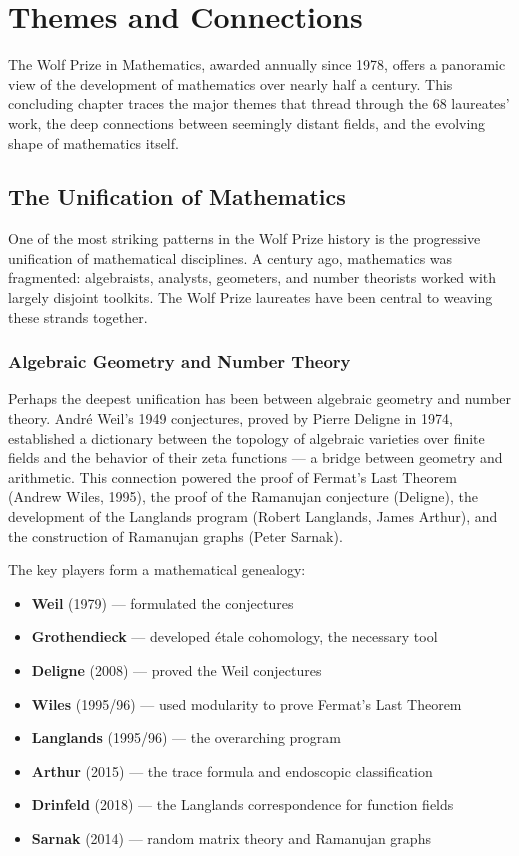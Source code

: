 \chapter{Themes and Connections}

The Wolf Prize in Mathematics, awarded annually since 1978, offers a panoramic view of the development of mathematics over nearly half a century. This concluding chapter traces the major themes that thread through the 68 laureates' work, the deep connections between seemingly distant fields, and the evolving shape of mathematics itself.

\section{The Unification of Mathematics}

One of the most striking patterns in the Wolf Prize history is the progressive unification of mathematical disciplines. A century ago, mathematics was fragmented: algebraists, analysts, geometers, and number theorists worked with largely disjoint toolkits. The Wolf Prize laureates have been central to weaving these strands together.

\subsection{Algebraic Geometry and Number Theory}

Perhaps the deepest unification has been between algebraic geometry and number theory. Andr\'e Weil's 1949 conjectures, proved by Pierre Deligne in 1974, established a dictionary between the topology of algebraic varieties over finite fields and the behavior of their zeta functions --- a bridge between geometry and arithmetic. This connection powered the proof of Fermat's Last Theorem (Andrew Wiles, 1995), the proof of the Ramanujan conjecture (Deligne), the development of the Langlands program (Robert Langlands, James Arthur), and the construction of Ramanujan graphs (Peter Sarnak).

The key players form a mathematical genealogy:
\begin{itemize}
    \item \textbf{Weil} (1979) --- formulated the conjectures
    \item \textbf{Grothendieck} --- developed \'etale cohomology, the necessary tool
    \item \textbf{Deligne} (2008) --- proved the Weil conjectures
    \item \textbf{Wiles} (1995/96) --- used modularity to prove Fermat's Last Theorem
    \item \textbf{Langlands} (1995/96) --- the overarching program
    \item \textbf{Arthur} (2015) --- the trace formula and endoscopic classification
    \item \textbf{Drinfeld} (2018) --- the Langlands correspondence for function fields
    \item \textbf{Sarnak} (2014) --- random matrix theory and Ramanujan graphs
\end{itemize}

